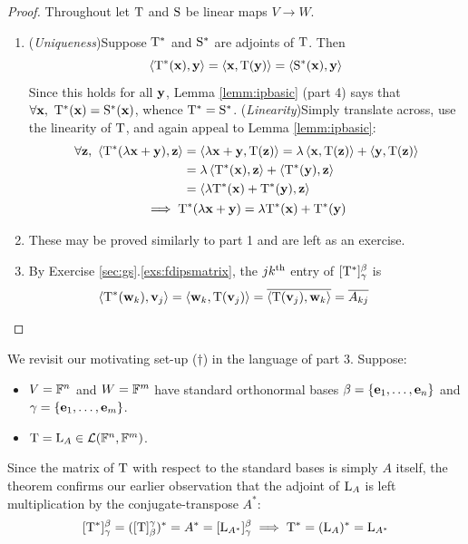 \begin{proof}
	Throughout let $\rT$ and $\rS$ be linear maps $V\to W$.
	\begin{enumerate}
	  \item (\emph{Uniqueness})\quad Suppose $\rT^*$ and $\rS^*$ are adjoints of $\rT$. Then
		\[
			\ip{\rT^*(\vx),\vy}=\ip{\vx,\rT(\vy)}=\ip{\rS^*(\vx),\vy}
		\]
		Since this holds for all $\vy$, Lemma \ref{lemm:ipbasic} (part 4) says that $\forall\vx,\ \rT^*(\vx)=\rS^*(\vx)$, whence $\rT^*=\rS^*$.\smallbreak
		(\emph{Linearity})\quad Simply translate across, use the linearity of $\rT$, and again appeal to Lemma \ref{lemm:ipbasic}:
		\begin{gather*}
			\begin{aligned}
			\forall\vz,\ \ip{\rT^*(\lambda\vx+\vy),\vz} &=\ip{\lambda\vx+\vy,\rT(\vz)} =\lambda\ip{\vx,\rT(\vz)} +\ip{\vy,\rT(\vz)}\\
			&=\lambda\ip{\rT^*(\vx),\vz} +\ip{\rT^*(\vy),\vz}\\
			&=\ip{\lambda \rT^*(\vx)+\rT^*(\vy),\vz}
			\end{aligned}\\
		\implies \rT^*(\lambda\vx+\vy)=\lambda \rT^*(\vx)+\rT^*(\vy)
		\end{gather*}
	
		\item These may be proved similarly to part 1 and are left as an exercise.
	  
	  \item By Exercise \ref*{sec:gs}.\ref{exs:fdipsmatrix}, the $jk\th$ entry of $[\rT^*]_\gamma^\beta$ is 
		\[
			\ip{\rT^*(\vw_k),\vv_j}=\ip{\vw_k,\rT(\vv_j)}
			=\cl{\ip{\rT(\vv_j),\vw_k}}=\cl{A_{kj}}\tag*{\qedhere}
		\]\vspace{-15pt}
	\end{enumerate}
\end{proof}

We revisit our motivating set-up ($\dag$) in the language of part 3. Suppose:
\begin{itemize}
  \item $V=\F^n$ and $W=\F^m$ have standard orthonormal bases $\beta=\{\vect en\}$ and $\gamma=\{\vect em\}$.
  \item $\rT=\rL_A\in\cL(\F^n,\F^m)$. 
\end{itemize}
Since the matrix of $\rT$ with respect to the standard bases is simply $A$ itself, the theorem confirms our earlier observation that the adjoint of $\rL_A$ is left multiplication by the conjugate-transpose $A^*$:
\[
	[\rT^*]_\gamma^\beta=([\rT]_\beta^\gamma)^*=A^*=[\rL_{A^*}]_\gamma^\beta
	\implies \rT^*=(\rL_A)^*=\rL_{A^*}
\]

